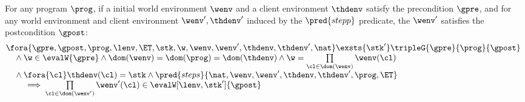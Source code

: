 \begin{theorem}
\label{def:soundness-prog}
For any program \( \prog \), if a initial world environment \( \wenv \) and a client environment \( \thdenv \) satisfy the precondition \( \gpre \), and for any world environment and client environment \( \wenv', \thdenv' \) induced by the \( \pred{stepp} \) predicate, the \( \wenv' \) satisfies the postcondition \( \gpost \):
\[
\begin{array}{@{}l}
\fora{\gpre, \gpost, \prog, \lenv, \ET, \stk, \w, \wenv, \wenv', \thdenv, \thdenv', \nat}  \exsts{\stk'}
    \tripleG{\gpre}{\prog}{\gpost} \\
    \quad {} \land \w \in \evalW{\gpre}
    \land \dom(\wenv) = \dom(\prog) = \dom(\thdenv)
    \land \w = \prod\limits_{\cl \in \dom(\wenv)} \wenv(\cl) \\
    \quad {} \land \fora{\cl} \thdenv(\cl) = \stk
    \land \pred{steps}{\nat,\wenv, \wenv', \thdenv, \thdenv',\prog, \ET}  \\
    \qquad {} \implies \prod\limits_{\cl \in \dom(\wenv')} \wenv'(\cl) \in \evalW[\lenv, \stk']{\gpost}
\end{array}
\] 
\end{theorem}
